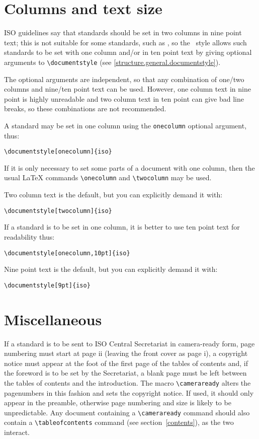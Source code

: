 \section{Columns and text size}
\label{columns}
ISO guidelines say that standards should be set in two columns in nine
point text; this is
not suitable for some standards, such as \cite{sgml}, so the \iso\ style
allows such standards to be set with one column and/or in ten point text
by giving optional
arguments to \verb|\documentstyle| (see \ref{structure.general.documentstyle}).

The optional arguments are independent, so that any combination of one/two
columns and nine/ten point text can be used.
However, one column text in nine point is highly unreadable and two
column text in ten point can give bad line breaks, so these combinations
are not recommended.

A standard may be set in one column using the \verb|onecolumn| optional
argument, thus:
\begin{verbatim}
\documentstyle[onecolumn]{iso}
\end{verbatim}
If it is only necessary to set some parts of a document with one column, then
the usual LaTeX commands \verb|\onecolumn| and \verb|\twocolumn| may be used.

Two column text is the default, but you can explicitly demand it with:
\begin{verbatim}
\documentstyle[twocolumn]{iso}
\end{verbatim}

If a standard is to be set in one column, it is better to use ten point
text for readability thus:
\begin{verbatim}
\documentstyle[onecolumn,10pt]{iso}
\end{verbatim}

Nine point text is the default, but you can explicitly demand it with:
\begin{verbatim}
\documentstyle[9pt]{iso}
\end{verbatim}

\section{Miscellaneous}

If a standard is to be sent to ISO Central Secretariat in camera-ready form,
page numbering must start at page ii (leaving the front cover as page i),
a copyright notice must appear at the foot of the first page of the tables
of contents and,
if the foreword is to be set by the Secretariat, a blank page must be left
between the tables of contents and the introduction.
The macro \verb|\cameraready| alters the pagenumbers in this fashion and sets
the copyright notice.
If used, it should only appear in the preamble, otherwise page numbering and
size is likely to be unpredictable.
Any document containing a \verb|\cameraready| command should also contain a
\verb|\tableofcontents| command (see section~\ref{contents}), as the two
interact.

